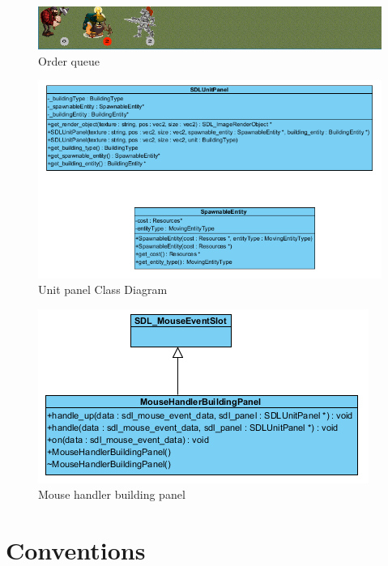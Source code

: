\begin{figure}[!htb]
    \centering
    \includegraphics[scale=0.8]{res/unit-panel-order-queue.png}
    \caption{Order queue}\label{fig:unit-panel-order-queue}
\end{figure}

\begin{figure}[!htb]
    \centering
    \includegraphics[scale=0.8]{res/unit-panel-class-diagram.png}
    \caption{Unit panel Class Diagram}\label{fig:unit-panel-class-diagram}
\end{figure}

\begin{figure}[!htb]
    \centering
    \includegraphics[scale=0.8]{res/mousehandlerbuildingpanel.png}
    \caption{Mouse handler building panel}\label{fig:mousehandlerbuildingpanel}
\end{figure}

\section{Conventions}
